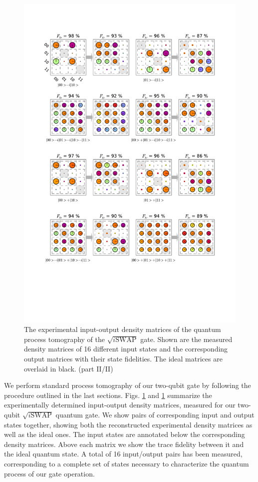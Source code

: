 \begin{figure}[p]
	\centering
		\includegraphics[width=1\textwidth]{"./data/ct5/2011_04_21 - grover and tomo/good_data/process -matrices 2"}
	\caption{The experimental input-output density matrices of the quantum process tomography of the $\sqrt{i\mathrm{SWAP}}$ gate. Shown are the measured density matrices of 16 different input states and the corresponding output matrices with their state fidelities. The ideal matrices are overlaid in black. (part II/II)}
	\label{fig:process_matrices_1}
\end{figure}

We perform standard process tomography of our two-qubit gate by following the procedure outlined in the last sections. Figs. \ref{fig:process_matrices_1} and \ref{fig:process_matrices_1} summarize the experimentally determined input-output density matrices, measured for our two-qubit $\sqrt{i\mathrm{SWAP}}$ quantum gate. We show pairs of corresponding input and output states together, showing both the reconstructed experimental density matrices as well as the ideal ones. The input states are annotated below the corresponding density matrices. Above each matrix we show the trace fidelity between it and the ideal quantum state. A total of 16 input/output pairs has been measured, corresponding to a complete set of states necessary to characterize the quantum process of our gate operation.

